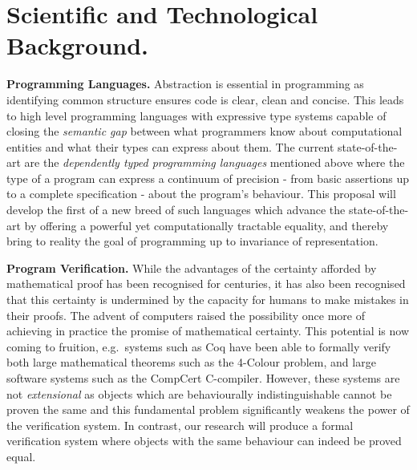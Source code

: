 \documentclass[a4paper,11pt]{article}
\newcommand{\eg}{{e.g.}\ }
\begin{document}

\vspace*{-0.1in} 
\section{Scientific and Technological Background.}
\vspace*{-0.1in} 

{\bf Programming Languages.} Abstraction is essential in programming
as identifying common structure ensures code is clear,
clean and concise. This leads to high level
programming languages with expressive type systems capable of closing
the {\em semantic gap} between what programmers know about
computational entities and what their types can express about them.
The current state-of-the-art are the {\em dependently typed
  programming languages} mentioned above where
the type of a program can express a
continuum of precision - from basic assertions up to a complete
specification - about the program’s behaviour. This proposal will
develop the first of a new breed of 
such languages which advance the state-of-the-art by offering a
powerful yet computationally tractable equality, and thereby bring to
reality the goal of programming up to invariance of representation.


{\bf Program Verification.} While the advantages of the certainty
afforded by mathematical proof has been recognised for centuries, it
has also been recognised that this certainty is undermined by the
capacity for humans to make mistakes in their proofs. The advent of
computers raised the possibility once more of achieving in practice
the promise of mathematical certainty. This potential is now coming to
fruition, \eg systems such as Coq have been able to formally verify
both large mathematical theorems such as the 4-Colour problem, and
large software systems such as the CompCert C-compiler. However, these
systems are not {\em extensional} as objects which are behaviourally
indistinguishable cannot be proven the same and this fundamental problem
significantly weakens the power of the verification system. In contrast, our
research will produce a formal verification system where objects
with the same behaviour can indeed be proved equal.
\end{document}
